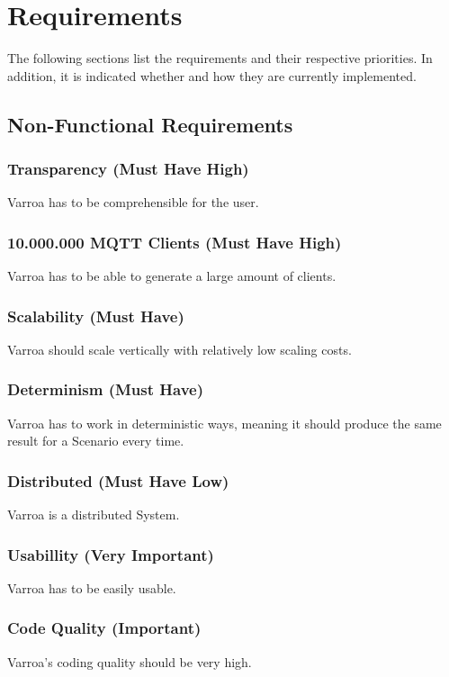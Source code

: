 \chapter{Requirements}
The following sections list the requirements and their respective priorities.
In addition, it is indicated whether and how they are currently implemented.

\section{Non-Functional Requirements}

\subsection{Transparency (Must Have High)} 
Varroa has to be comprehensible for the user.

\subsection{10.000.000 MQTT Clients (Must Have High)} 
Varroa has to be able to generate a large amount of clients.

\subsection{Scalability (Must Have)} 
Varroa should scale vertically with relatively low scaling costs.

\subsection{Determinism (Must Have)} 
Varroa has to work in deterministic ways, meaning it should produce the same result for a Scenario every time.

\subsection{Distributed (Must Have Low)} 
Varroa is a distributed System.
 
\subsection{Usabillity (Very Important)} 
Varroa has to be easily usable.

\subsection{Code Quality (Important)} 
Varroa's coding quality should be very high.

